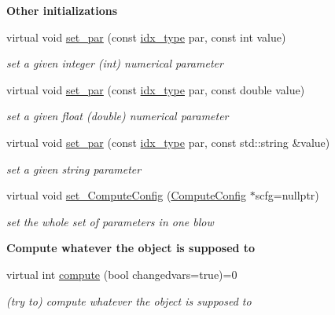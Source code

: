 \begin{Indent}\textbf{ Other initializations}\par
\begin{DoxyCompactItemize}
\item 
virtual void \mbox{\hyperlink{class_s_m_spp__di__unipi__it_1_1_thin_compute_interface_a73669f587bb938b587c54ad7e73ec297}{set\+\_\+par}} (const \mbox{\hyperlink{class_s_m_spp__di__unipi__it_1_1_thin_compute_interface_aa3d710629ad8c434286726ad810c3b47}{idx\+\_\+type}} par, const int value)
\begin{DoxyCompactList}\small\item\em set a given integer (int) numerical parameter \end{DoxyCompactList}\item 
virtual void \mbox{\hyperlink{class_s_m_spp__di__unipi__it_1_1_thin_compute_interface_a602be88195984f4f1b5dff7995976530}{set\+\_\+par}} (const \mbox{\hyperlink{class_s_m_spp__di__unipi__it_1_1_thin_compute_interface_aa3d710629ad8c434286726ad810c3b47}{idx\+\_\+type}} par, const double value)
\begin{DoxyCompactList}\small\item\em set a given float (double) numerical parameter \end{DoxyCompactList}\item 
virtual void \mbox{\hyperlink{class_s_m_spp__di__unipi__it_1_1_thin_compute_interface_acefe0a2a66d64babff1331eba9cac34d}{set\+\_\+par}} (const \mbox{\hyperlink{class_s_m_spp__di__unipi__it_1_1_thin_compute_interface_aa3d710629ad8c434286726ad810c3b47}{idx\+\_\+type}} par, const std\+::string \&value)
\begin{DoxyCompactList}\small\item\em set a given string parameter \end{DoxyCompactList}\item 
virtual void \mbox{\hyperlink{class_s_m_spp__di__unipi__it_1_1_thin_compute_interface_a8f4741c9baa5d7de2bd6129f3d08bf16}{set\+\_\+\+Compute\+Config}} (\mbox{\hyperlink{class_s_m_spp__di__unipi__it_1_1_compute_config}{Compute\+Config}} $\ast$scfg=nullptr)
\begin{DoxyCompactList}\small\item\em set the whole set of parameters in one blow \end{DoxyCompactList}\end{DoxyCompactItemize}
\end{Indent}
\begin{Indent}\textbf{ Compute whatever the object is supposed to}\par
\begin{DoxyCompactItemize}
\item 
virtual int \mbox{\hyperlink{class_s_m_spp__di__unipi__it_1_1_thin_compute_interface_a00fd6363d98ea46bcc273842b327d050}{compute}} (bool changedvars=true)=0
\begin{DoxyCompactList}\small\item\em (try to) compute whatever the object is supposed to \end{DoxyCompactList}\end{DoxyCompactItemize}
\end{Indent}
